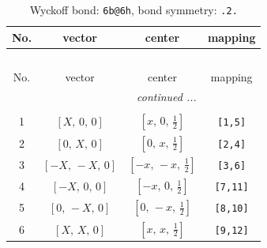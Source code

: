\documentclass[fleqn,8pt]{jsarticle}
\begin{document}
\begin{longtable}{cccc}
\caption{Wyckoff bond: {\tt 6b@6h}, bond symmetry: {\tt .2.}}
 \\
 \hline \hline
No. & vector & center & mapping \\ \hline \endfirsthead

\multicolumn{3}{l}{\tablename\ \thetable{}} \\
 \hline \hline
No. & vector & center & mapping \\ \hline \endhead

 \hline \hline
\multicolumn{3}{r}{\footnotesize\it continued ...} \\ \endfoot

 \hline \hline
\multicolumn{3}{r}{} \\ \endlastfoot

1 & $\left[ X,\, 0,\, 0 \right]$ & $\left[ x,\, 0,\, \frac{1}{2} \right]$ & {\tt [1,5]} \\ \hline
2 & $\left[ 0,\, X,\, 0 \right]$ & $\left[ 0,\, x,\, \frac{1}{2} \right]$ & {\tt [2,4]} \\ \hline
3 & $\left[ - X,\, - X,\, 0 \right]$ & $\left[ - x,\, - x,\, \frac{1}{2} \right]$ & {\tt [3,6]} \\ \hline
4 & $\left[ - X,\, 0,\, 0 \right]$ & $\left[ - x,\, 0,\, \frac{1}{2} \right]$ & {\tt [7,11]} \\ \hline
5 & $\left[ 0,\, - X,\, 0 \right]$ & $\left[ 0,\, - x,\, \frac{1}{2} \right]$ & {\tt [8,10]} \\ \hline
6 & $\left[ X,\, X,\, 0 \right]$ & $\left[ x,\, x,\, \frac{1}{2} \right]$ & {\tt [9,12]} \\
\end{longtable}
\renewcommand{\arraystretch}{1.2}
\end{document}
